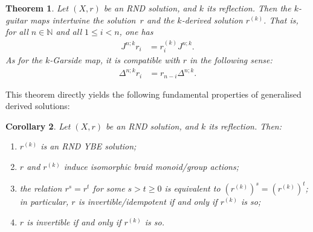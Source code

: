 \documentclass{amsart}
\newcommand{\N}{\mathbb{N}}
\theoremstyle{plain}
\newtheorem{thm}{Theorem}[section]
\newtheorem{cor}[thm]{Corollary}
\theoremstyle{definition}
\theoremstyle{remark}
\begin{document}
\begin{thm}\label{T:GenDerived}
Let $(X,r)$ be an RND solution, and $k$ its reflection. Then the $k$-guitar maps intertwine the solution~$r$ and the $k$-derived solution $r^{(k)}$. That is, for all $n \in \N$ and all $1 \leq i <n$, one has
\begin{align}
J^{n;k}r_i &= r^{(k)}_iJ^{n;k}.\label{E:JandR}
\end{align}
As for the $k$-Garside map, it is compatible with $r$ in the following sense:
\begin{align}
\Delta^{n;k}r_i &= r_{n-i}\Delta^{n;k}.\label{E:DeltaandR}
\end{align}
\end{thm}

This theorem directly yields the following fundamental properties of generalised derived solutions:
\begin{cor}\label{C:GenDerived}
Let $(X,r)$ be an RND solution, and $k$ its reflection. Then:
\begin{enumerate}
\item $r^{(k)}$ is an RND YBE solution;
\item $r$ and $r^{(k)}$ induce isomorphic braid monoid/group actions;
\item the relation $r^s=r^t$ for some $s>t\geq 0$ is equivalent to $(r^{(k)})^s=(r^{(k)})^t$; in particular, $r$ is invertible/idempotent if and only if $r^{(k)}$ is so; 
\item $r$ is invertible if and only if $r^{(k)}$ is so. 
\end{enumerate}
\end{cor}
\end{document}
